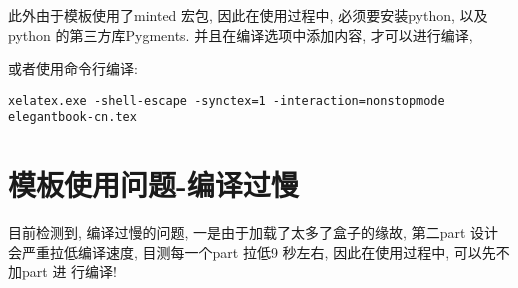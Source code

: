 此外由于模板使用了minted 宏包, 因此在使用过程中, 必须要安装python, 以及python 的第三方库Pygments.
并且在编译选项中添加内容, 才可以进行编译,

或者使用命令行编译:
\begin{verbatim}
xelatex.exe -shell-escape -synctex=1 -interaction=nonstopmode elegantbook-cn.tex
\end{verbatim}

\section{模板使用问题-编译过慢}
目前检测到, 编译过慢的问题, 一是由于加载了太多了盒子的缘故,
第二part 设计会严重拉低编译速度, 目测每一个part 拉低9 秒左右, 因此在使用过程中, 可以先不加part 进
行编译!


